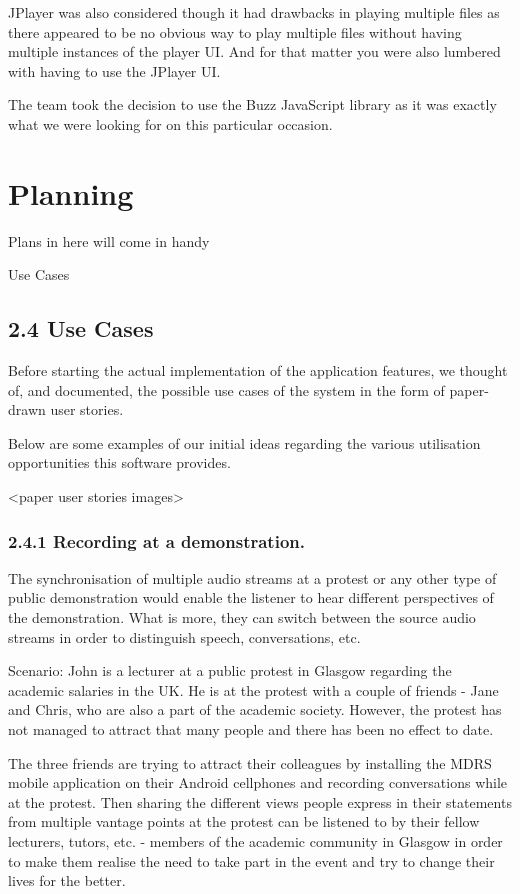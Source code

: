 \documentclass{l3proj}
\begin{document}
JPlayer was also considered though it had drawbacks in playing multiple files as there appeared to be no obvious way to play multiple files without having multiple instances of the player UI. And for that matter you were also lumbered with having to use the JPlayer UI.

The team took the decision to use the Buzz JavaScript library as it was exactly what we were looking for on this particular occasion.

\chapter{Planning}
\label{Planning}

Plans in here will come in handy


Use Cases

\section{2.4 Use Cases}

Before starting the actual implementation of the application features, we thought of, and documented, the possible use cases of the system in the form of paper-drawn user stories.

Below are some examples of our initial ideas regarding the various utilisation opportunities this software provides.

<paper user stories images>

\subsection{2.4.1 Recording at a demonstration.} The synchronisation of multiple audio streams at a protest or any other type of public demonstration would enable the listener to hear different perspectives of the demonstration. What is more, they can switch between the source audio streams in order to distinguish speech, conversations, etc.

Scenario: John is a lecturer at a public protest in Glasgow regarding the academic salaries in the UK. He is at the protest with a couple of friends - Jane and Chris, who are also a part of the academic society. However, the protest has not managed to attract that many people and there has been no effect to date.

The three friends are trying to attract their colleagues by installing the MDRS mobile application on their Android cellphones and recording conversations while at the protest. Then sharing the different views people express in their statements from multiple vantage points at the protest can be listened to by their fellow lecturers, tutors, etc. - members of the academic community in Glasgow in order to make them realise the need to take part in the event and try to change their lives for the better.
\end{document}
